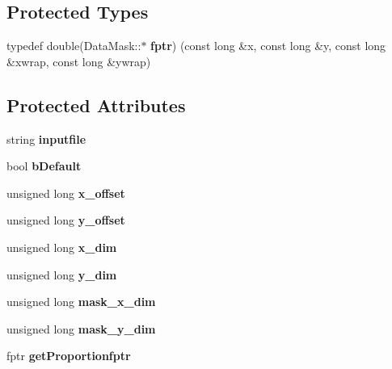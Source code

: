 \subsection*{Protected Types}
\begin{DoxyCompactItemize}
\item 
typedef double(Data\+Mask\+::$\ast$ {\bfseries fptr}) (const long \&x, const long \&y, const long \&xwrap, const long \&ywrap)\hypertarget{class_data_mask_a0ed51de5661fc3046d085e044a7efd4a}{}\label{class_data_mask_a0ed51de5661fc3046d085e044a7efd4a}

\end{DoxyCompactItemize}
\subsection*{Protected Attributes}
\begin{DoxyCompactItemize}
\item 
string {\bfseries inputfile}\hypertarget{class_data_mask_acde16cc845a6102a8b2ee0aa9b8917cb}{}\label{class_data_mask_acde16cc845a6102a8b2ee0aa9b8917cb}

\item 
bool {\bfseries b\+Default}\hypertarget{class_data_mask_af5d895b50f04eceac1e473dee6f36703}{}\label{class_data_mask_af5d895b50f04eceac1e473dee6f36703}

\item 
unsigned long {\bfseries x\+\_\+offset}\hypertarget{class_data_mask_a70178c907b2dc072b62f4bfb8f690823}{}\label{class_data_mask_a70178c907b2dc072b62f4bfb8f690823}

\item 
unsigned long {\bfseries y\+\_\+offset}\hypertarget{class_data_mask_ab4508058d8563d90bfc606a648cedb2f}{}\label{class_data_mask_ab4508058d8563d90bfc606a648cedb2f}

\item 
unsigned long {\bfseries x\+\_\+dim}\hypertarget{class_data_mask_aba77e907211dea06a4a52ad3036716b0}{}\label{class_data_mask_aba77e907211dea06a4a52ad3036716b0}

\item 
unsigned long {\bfseries y\+\_\+dim}\hypertarget{class_data_mask_aa2c689edd7b8bd84bb60e836aac4e378}{}\label{class_data_mask_aa2c689edd7b8bd84bb60e836aac4e378}

\item 
unsigned long {\bfseries mask\+\_\+x\+\_\+dim}\hypertarget{class_data_mask_ab971fd5a14a17e850cd92c79c3a1543e}{}\label{class_data_mask_ab971fd5a14a17e850cd92c79c3a1543e}

\item 
unsigned long {\bfseries mask\+\_\+y\+\_\+dim}\hypertarget{class_data_mask_a5ab1bf33e9b9fac964c8c2576fc5edca}{}\label{class_data_mask_a5ab1bf33e9b9fac964c8c2576fc5edca}

\item 
fptr {\bfseries get\+Proportionfptr}\hypertarget{class_data_mask_a67c92c63f3397de5312c573281515c1c}{}\label{class_data_mask_a67c92c63f3397de5312c573281515c1c}

\end{DoxyCompactItemize}


